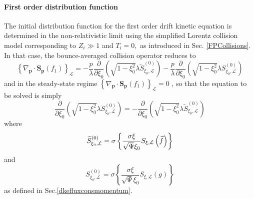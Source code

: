 

\label{dkediscretinit}

\paragraph{First order distribution function}

The initial distribution function for the first order drift kinetic equation
is determined in the non-relativistic limit using the simplified Lorentz
collision model corresponding to $Z_{i}\gg 1$ and $T_{i}=0,$ as introduced
in Sec. \ref{FPCollisions}. In that case, the bounce-averaged collision
operator reduces to
\begin{equation}
\left\{ \nabla _{\mathbf{p}}\cdot \mathbf{S}_{\mathbf{p}}\left( f_{1}\right)
\right\} _{\mathcal{L}}=-\frac{p}{\lambda }\frac{\partial }{\partial \xi _{0}%
}\left( \sqrt{1-\xi _{0}^{2}}\lambda \widetilde{S}_{\xi _{0},\mathcal{L}%
}^{\left( 0\right) }\right) -\frac{p}{\lambda }\frac{\partial }{\partial \xi
_{0}}\left( \sqrt{1-\xi _{0}^{2}}\lambda S_{\xi _{0},\mathcal{L}}^{\left(
0\right) }\right)
\end{equation}
and in the steady-state regime $\left\{ \nabla _{\mathbf{p}}\cdot \mathbf{S}
_{\mathbf{p}}\left( f_{1}\right) \right\} _{\mathcal{L}}=0$ , so that the
equation to be solved is simply
\begin{equation}
\frac{\partial }{\partial \xi _{0}}\left( \sqrt{1-\xi _{0}^{2}}\lambda
S_{\xi _{0},\mathcal{L}}^{\left( 0\right) }\right) =-\frac{\partial }{
\partial \xi _{0}}\left( \sqrt{1-\xi _{0}^{2}}\lambda \widetilde{S}_{\xi
_{0},\mathcal{L}}^{\left( 0\right) }\right)
\end{equation}
where
\begin{equation}
\widetilde{S}_{\xi _{0},\mathcal{L}}^{\left( 0\right) }=\sigma \left\{ \frac{%
\sigma \xi }{\sqrt{\Psi }\xi _{0}}S_{\xi ,\mathcal{L}}\left( \widetilde{f}%
\right) \right\}
\end{equation}
and
\begin{equation}
S_{\xi _{0},\mathcal{L}}^{\left( 0\right) }=\sigma \left\{ \frac{\sigma \xi
}{\sqrt{\Psi }\xi _{0}}S_{\xi ,\mathcal{L}}\left( g\right) \right\}
\end{equation}
as defined in Sec.\ref{dkefluxconsmomentum}.

